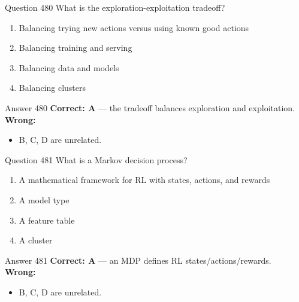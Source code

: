 \documentclass[aspectratio=169,11pt]{beamer}
\begin{document}
	\begin{frame}{Question 480}
		What is the exploration-exploitation tradeoff?
		\begin{enumerate}[label=\Alph*.]
			\item Balancing trying new actions versus using known good actions
			\item Balancing training and serving
			\item Balancing data and models
			\item Balancing clusters
		\end{enumerate}
	\end{frame}
	\begin{frame}{Answer 480}
		\textbf{Correct: A} --- the tradeoff balances exploration and exploitation.\\
		\vspace{0.5em}
		\textbf{Wrong:}
		\begin{itemize}
			\item B, C, D are unrelated.
		\end{itemize}
	\end{frame}
	
	\begin{frame}{Question 481}
		What is a Markov decision process?
		\begin{enumerate}[label=\Alph*.]
			\item A mathematical framework for RL with states, actions, and rewards
			\item A model type
			\item A feature table
			\item A cluster
		\end{enumerate}
	\end{frame}
	\begin{frame}{Answer 481}
		\textbf{Correct: A} --- an MDP defines RL states/actions/rewards.\\
		\vspace{0.5em}
		\textbf{Wrong:}
		\begin{itemize}
			\item B, C, D are unrelated.
		\end{itemize}
	\end{frame}
	
\end{document}
